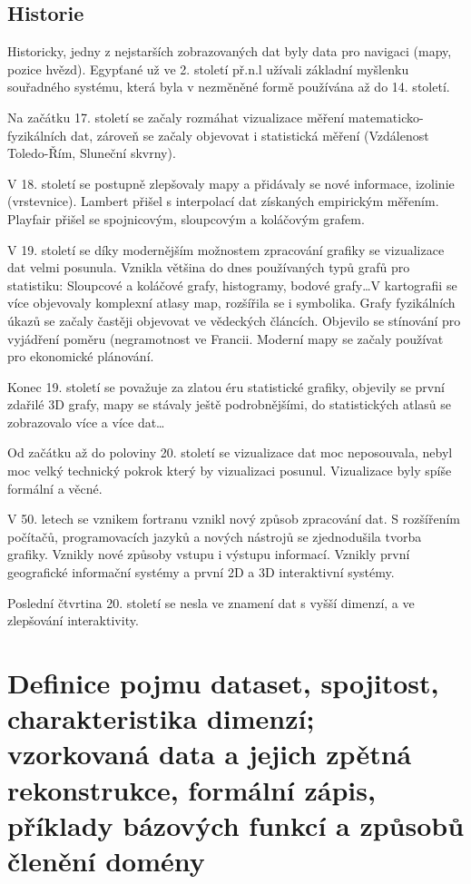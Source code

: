 \documentclass[10pt,a4paper, table]{article}
\begin{document}
\subsection{Historie}
Historicky, jedny z nejstarších zobrazovaných dat byly data pro navigaci (mapy, pozice hvězd). Egypťané už ve 2. století př.n.l užívali základní myšlenku souřadného systému, která byla v nezměněné formě používána až do 14. století. \par
Na začátku 17. století se začaly rozmáhat vizualizace měření matematicko-fyzikálních dat, zároveň se začaly objevovat i statistická měření (Vzdálenost Toledo-Řím, Sluneční skvrny). \par
V 18. století se postupně zlepšovaly mapy a přidávaly se nové informace, izolinie (vrstevnice). Lambert přišel s interpolací dat získaných empirickým měřením. Playfair přišel se spojnicovým, sloupcovým a koláčovým grafem. \par
V 19. století se díky modernějším možnostem zpracování grafiky se vizualizace dat velmi posunula. Vznikla většina do dnes používaných typů grafů pro statistiku: Sloupcové a koláčové grafy, histogramy, bodové grafy\dots V kartografii se více objevovaly komplexní atlasy map, rozšířila se i symbolika. Grafy fyzikálních úkazů se začaly častěji objevovat ve vědeckých článcích. Objevilo se stínování pro vyjádření poměru (negramotnost ve Francii. Moderní mapy se začaly používat pro ekonomické plánování. \par
Konec 19. století se považuje za zlatou éru statistické grafiky, objevily se první zdařilé 3D grafy, mapy se stávaly ještě podrobnějšími, do statistických atlasů se zobrazovalo více a více dat\dots \par
Od začátku až do poloviny 20. století se vizualizace dat moc neposouvala, nebyl moc velký technický pokrok který by vizualizaci posunul. Vizualizace byly spíše formální a věcné. \par
V 50. letech se vznikem fortranu vznikl nový způsob zpracování dat. S rozšířením počítačů, programovacích jazyků a nových nástrojů se zjednodušila tvorba grafiky. Vznikly nové způsoby vstupu i výstupu informací. Vznikly první geografické informační systémy a první 2D a 3D interaktivní systémy. \par
Poslední čtvrtina 20. století se nesla ve znamení dat s vyšší dimenzí, a ve zlepšování interaktivity.

\clearpage
\section{Definice  pojmu  dataset, spojitost, charakteristika dimenzí; vzorkovaná data a jejich zpětná rekonstrukce, formální zápis, příklady bázových funkcí a způsobů členění domény}
\end{document}
